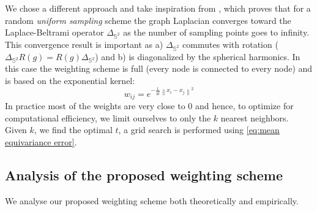 \documentclass{article} %
\newcommand{\norm}[1]{\left\lVert#1\right\rVert}
\begin{document}
We chose a different approach and take inspiration from \cite{belkin2005towards}, which proves that for a random \emph{uniform sampling} scheme the graph Laplacian converges toward the Laplace-Beltrami operator $\Delta_{\mathbb{S}^2}$ as the number of sampling points goes to infinity.
This convergence result is important as a) $\Delta_{\mathbb{S}^2}$ commutes with rotation ($\Delta_{\mathbb{S}^2}R(g) = R(g)\Delta_{\mathbb{S}^2}$) and b) is diagonalized by the spherical harmonics.
In this case the weighting scheme is full (every node is connected to every node) and is based on the exponential kernel:
\begin{equation} \label{eq:belkin_weights}
w_{ij} = e^{-\frac{1}{4t} \norm{x_i-x_j}^2}
\end{equation}
In practice most of the weights are very close to $0$ and hence, to optimize for computational efficiency, we limit ourselves to only the $k$ nearest neighbors. Given $k$, we find the optimal $t$, a grid search is performed using \eqref{eq:mean equivariance error}.


\subsection{Analysis of the proposed weighting scheme}
We analyse our proposed weighting scheme both theoretically and empirically.
\end{document}
